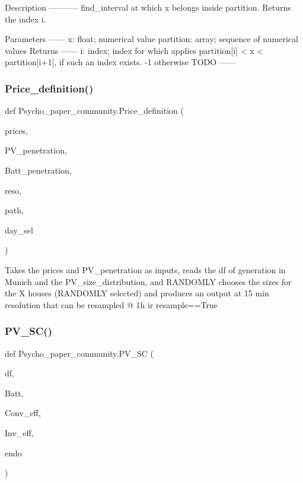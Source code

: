 \begin{DoxyVerb}Description
-----------
find_interval at which x belongs inside partition. Returns the index i.

Parameters
------
x: float; numerical value
partition: array; sequence of numerical values
Returns
------
i: index; index for which applies
partition[i] < x < partition[i+1], if such an index exists.
-1 otherwise
TODO
------
\end{DoxyVerb}
 \mbox{\label{namespace_psycho__paper__community_a55c0842aa06303ca13fb7c4124534a18}} 
\subsubsection{\texorpdfstring{Price\+\_\+definition()}{Price\_definition()}}
{\footnotesize\ttfamily def Psycho\+\_\+paper\+\_\+community.\+Price\+\_\+definition (\begin{DoxyParamCaption}\item[{}]{prices,  }\item[{}]{P\+V\+\_\+penetration,  }\item[{}]{Batt\+\_\+penetration,  }\item[{}]{reso,  }\item[{}]{path,  }\item[{}]{day\+\_\+sel }\end{DoxyParamCaption})}

\begin{DoxyVerb}Takes the prices and PV_penetration as inputs, reads the df of generation in Munich and the PV_size_distribution,
and RANDOMLY chooses the sizes for the X houses (RANDOMLY selected) and produces an output at 15 min resolution that can be resampled @ 1h ir resample==True
\end{DoxyVerb}
 \mbox{\label{namespace_psycho__paper__community_abefde718373bb160a718d8db9cd371b8}} 
\subsubsection{\texorpdfstring{P\+V\+\_\+\+S\+C()}{PV\_SC()}}
{\footnotesize\ttfamily def Psycho\+\_\+paper\+\_\+community.\+P\+V\+\_\+\+SC (\begin{DoxyParamCaption}\item[{}]{df,  }\item[{}]{Batt,  }\item[{}]{Conv\+\_\+eff,  }\item[{}]{Inv\+\_\+eff,  }\item[{}]{endo }\end{DoxyParamCaption})}

